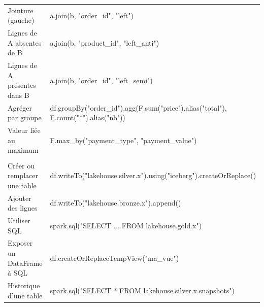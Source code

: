 \documentclass[11pt,a4paper]{article}
\begin{document}
\begin{center}
\begin{tabularx}{\textwidth}{@{}>{\raggedright\arraybackslash}p{4.1cm} >{\raggedright\arraybackslash\ttfamily\footnotesize}X@{}}
Jointure (gauche) & a.join(b, "order\_id", "left") \\
Lignes de A absentes de B & a.join(b, "product\_id", "left\_anti") \\
Lignes de A présentes dans B & a.join(b, "order\_id", "left\_semi") \\
Agréger par groupe & df.groupBy("order\_id").agg(F.sum("price").alias("total"), F.count("*").alias("nb")) \\
Valeur liée au maximum & F.max\_by("payment\_type", "payment\_value") \\
\midrule
\multicolumn{2}{@{}l}{\textbf{\textcolor{lhblue}{Écrire (tables Iceberg)}}} \\
Créer ou remplacer une table & df.writeTo("lakehouse.silver.x").using("iceberg").createOrReplace() \\
Ajouter des lignes & df.writeTo("lakehouse.bronze.x").append() \\
Utiliser SQL & spark.sql("SELECT ... FROM lakehouse.gold.x") \\
Exposer un DataFrame à SQL & df.createOrReplaceTempView("ma\_vue") \\
Historique d'une table & spark.sql("SELECT * FROM lakehouse.silver.x.snapshots") \\
\bottomrule
\end{tabularx}
\end{center}
\end{document}
